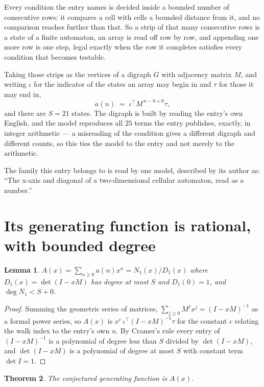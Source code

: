 \documentclass[11pt,a4paper]{article}
\theoremstyle{plain}
\newtheorem{theorem}{Theorem}
\newtheorem{lemma}[theorem]{Lemma}
\theoremstyle{definition}
\begin{document}
Every condition the entry names is decided inside a bounded number of consecutive rows: it
compares a cell with cells a bounded distance from it, and no comparison reaches further than
that. So a strip of that many consecutive rows is a state of a finite automaton, an array is
read off row by row, and appending one more row is one step, legal exactly when the row it
completes satisfies every condition that becomes testable.

Taking those strips as the vertices of a digraph $G$ with adjacency matrix $M$, and writing
$\iota$ for the indicator of the states an array may begin in and $\tau$ for those it may end
in,
\[
a(n)\;=\;\iota^{\!\top}M^{\,n-0+0}\tau ,
\]
and there are $S=21$ states. The digraph is built by reading the entry's own English, and the
model reproduces all $25$ terms the entry publishes, exactly, in integer arithmetic --- a
misreading of the condition gives a different digraph and different counts, so this ties the
model to the entry and not merely to the arithmetic.

The family this entry belongs to is read by one model, described by its author as: ``The x-axis and diagonal of a two-dimensional cellular automaton, read as a number.''


\section{Its generating function is rational, with bounded degree}

\begin{lemma}\label{lem:rat}
$A(x)=\sum_{n\ge0}a(n)x^n=N_1(x)/D_1(x)$ where $D_1(x)=\det(I-xM)$ has degree at most
$S$ and $D_1(0)=1$, and $\deg N_1<S+0$.
\end{lemma}

\begin{proof}
Summing the geometric series of matrices, $\sum_{j\ge0}M^jx^j=(I-xM)^{-1}$ as a formal
power series, so $A(x)$ is $x^{c}\,\iota^{\!\top}(I-xM)^{-1}\tau$ for the constant $c$
relating the walk index to the entry's own $n$. By Cramer's rule every entry of
$(I-xM)^{-1}$ is a polynomial of degree less than $S$ divided by $\det(I-xM)$, and
$\det(I-xM)$ is a polynomial of degree at most $S$ with constant term $\det I=1$.
\end{proof}

\begin{theorem}
The conjectured generating function is $A(x)$.
\end{theorem}
\end{document}
